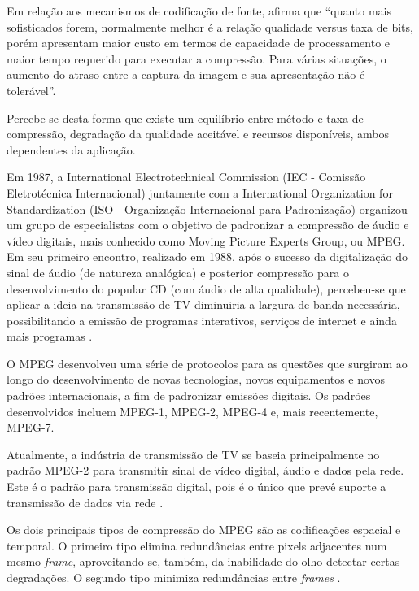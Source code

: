 Em relação aos mecanismos de codificação de fonte, \cite{rehme} afirma que “quanto mais sofisticados forem, normalmente melhor é a relação qualidade versus taxa de bits, porém apresentam maior custo em termos de capacidade de processamento e maior tempo requerido para executar a compressão. Para várias situações, o aumento do atraso entre a captura da imagem e sua apresentação não é tolerável”.

Percebe-se desta forma que existe um equilíbrio entre método e taxa de compressão, degradação da qualidade aceitável e recursos disponíveis, ambos dependentes da aplicação.

Em 1987, a International Electrotechnical Commission (IEC - Comissão Eletrotécnica Internacional) juntamente com a International Organization for Standardization (ISO - Organização Internacional para Padronização) organizou um grupo de especialistas com o objetivo de padronizar a compressão de áudio e vídeo digitais, mais conhecido como Moving Picture Experts Group, ou MPEG. Em seu primeiro encontro, realizado em 1988, após o sucesso da digitalização do sinal de áudio (de natureza analógica) e posterior compressão para o desenvolvimento do popular CD (com áudio de alta qualidade), percebeu-se que aplicar a ideia na transmissão de TV diminuiria a largura de banda necessária, possibilitando a emissão de programas interativos, serviços de internet e ainda mais programas \cite{mpeg2ref}.

O MPEG desenvolveu uma série de protocolos para as questões que surgiram ao longo do desenvolvimento de novas tecnologias, novos equipamentos e novos padrões internacionais, a fim de padronizar emissões digitais. Os padrões desenvolvidos incluem MPEG-1, MPEG-2, MPEG-4 e, mais recentemente, MPEG-7.

Atualmente, a indústria de transmissão de TV se baseia principalmente no padrão MPEG-2 para transmitir sinal de vídeo digital, áudio e dados pela rede. Este é o padrão para transmissão digital, pois é o único que prevê suporte a transmissão de dados via rede \cite{mpeg2ref}.

Os dois principais tipos de compressão do MPEG são as codificações espacial e temporal. O primeiro tipo elimina redundâncias entre pixels adjacentes num mesmo \emph{frame}, aproveitando-se, também, da inabilidade do olho detectar certas degradações. O segundo tipo minimiza redundâncias entre \emph{frames} \cite{mpeg2ref}.

